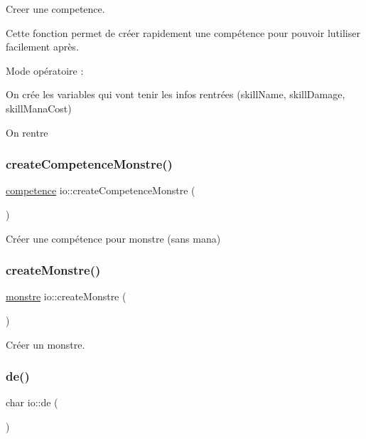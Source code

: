 Creer une competence. 

Cette fonction permet de créer rapidement une compétence pour pouvoir l\textquotesingle{}utiliser facilement après.

Mode opératoire \+:
\begin{DoxyItemize}
\item On crée les variables qui vont tenir les infos rentrées (skill\+Name, skill\+Damage, skill\+Mana\+Cost)
\item On rentre 
\end{DoxyItemize}\mbox{\label{namespaceio_a15bb99405bc68580d0d386d639a3a23c}} 
\subsubsection{\texorpdfstring{create\+Competence\+Monstre()}{createCompetenceMonstre()}}
{\footnotesize\ttfamily \hyperlink{classcompetence}{competence} io\+::create\+Competence\+Monstre (\begin{DoxyParamCaption}{ }\end{DoxyParamCaption})}



Créer une compétence pour monstre (sans mana) 

\mbox{\label{namespaceio_ad3711fbbc414b4d27c255ad8347d3ca2}} 
\subsubsection{\texorpdfstring{create\+Monstre()}{createMonstre()}}
{\footnotesize\ttfamily \hyperlink{classmonstre}{monstre} io\+::create\+Monstre (\begin{DoxyParamCaption}{ }\end{DoxyParamCaption})}



Créer un monstre. 

\mbox{\label{namespaceio_ae9908b55f26f07e78043d7cfad003d22}} 
\subsubsection{\texorpdfstring{de()}{de()}}
{\footnotesize\ttfamily char io\+::de (\begin{DoxyParamCaption}{ }\end{DoxyParamCaption})}



